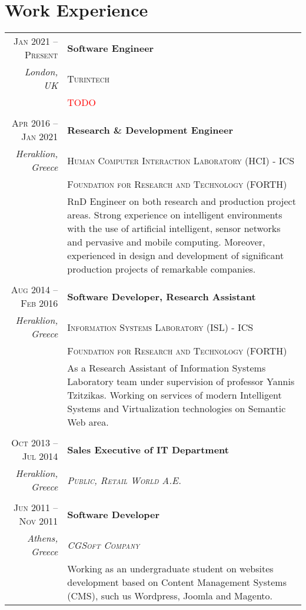 \documentclass[11pt]{article}
\begin{document}
\section{Work Experience}
\begin{longtable}{r|p{12.5cm}}

\textsc{Jan 2021 – Present} & \textbf{Software Engineer} \\
\footnotesize{\textit{London, UK}} &\textsc{Turintech } \\
&\footnotesize{\textcolor{red}{TODO}} \\

\multicolumn{2}{c}{} \\
\textsc{Apr 2016 – Jan 2021} & \textbf{Research \& Development Engineer} \\
\footnotesize{\textit{Heraklion, Greece}} &\textsc{Human Computer Interaction Laboratory (HCI) - ICS } \\
&\textsc{Foundation for Research and Technology (FORTH)} \\
&\footnotesize{RnD Engineer on both research and production project areas. Strong experience on intelligent environments with the use of artificial intelligent, sensor networks and pervasive and mobile computing. Moreover, experienced in design and development of significant production projects of remarkable companies.}\\

\multicolumn{2}{c}{} \\
\textsc{Aug 2014 – Feb 2016} & \textbf{Software Developer, Research Assistant} \\
\footnotesize{\textit{Heraklion, Greece}} &\textsc{Information Systems Laboratory (ISL) - ICS } \\
&\textsc{Foundation for Research and Technology (FORTH)} \\
&\footnotesize{As a Research Assistant of Information Systems Laboratory team under supervision of professor Yannis Tzitzikas. Working on services of modern Intelligent Systems and Virtualization technologies on Semantic Web area.}\\

\multicolumn{2}{c}{} \\
\textsc{Oct 2013 – Jul 2014} & \textbf{Sales Executive of IT Department} \\
\footnotesize{\textit{Heraklion, Greece}} &\emph{\textsc{Public, Retail World A.E.}} \\

\multicolumn{2}{c}{} \\
\textsc{Jun 2011 – Nov 2011} & \textbf{Software Developer} \\
\footnotesize{\textit{Athens, Greece}} &\emph{\textsc{CGSoft Company}} \\
&\footnotesize{Working as an undergraduate student on websites development based on Content Management Systems (CMS), such us Wordpress, Joomla and Magento.}\\
\end{longtable}
\end{document}
